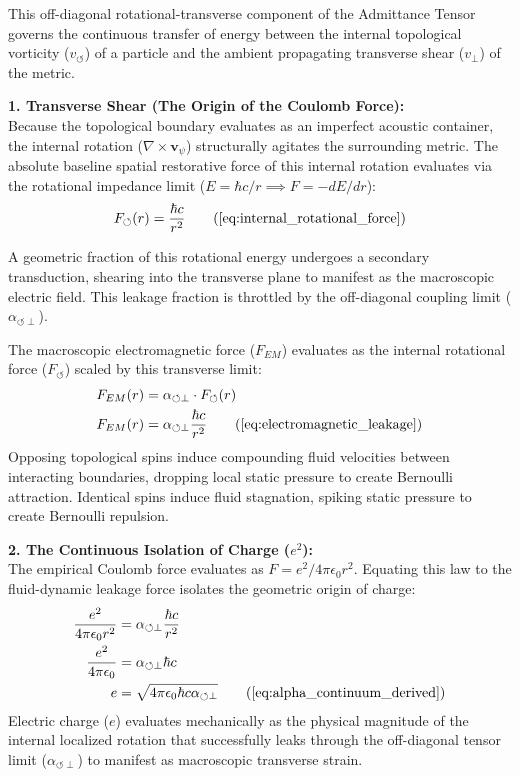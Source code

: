 \documentclass[11pt, a4paper]{article}
\begin{document}
This off-diagonal rotational-transverse component of the Admittance Tensor governs the continuous transfer of energy between the internal topological vorticity ($v_{\circlearrowleft}$) of a particle and the ambient propagating transverse shear ($v_{\perp}$) of the metric.

\textbf{1. Transverse Shear (The Origin of the Coulomb Force):} \\

Because the topological boundary evaluates as an imperfect acoustic container, the internal rotation ($\nabla \times \mathbf{v}_{\psi}$) structurally agitates the surrounding metric. The absolute baseline spatial restorative force of this internal rotation evaluates via the rotational impedance limit ($E = \hbar c / r \implies F = -dE/dr$):
\begin{equation}
    F_{\circlearrowleft}(r) = \frac{\hbar c}{r^2} \tag{\ref{eq:internal_rotational_force}}
\end{equation}

A geometric fraction of this rotational energy undergoes a secondary transduction, shearing into the transverse plane to manifest as the macroscopic electric field. This leakage fraction is throttled by the off-diagonal coupling limit ($\alpha_{\circlearrowleft \perp}$). 

The macroscopic electromagnetic force ($F_{EM}$) evaluates as the internal rotational force ($F_{\circlearrowleft}$) scaled by this transverse limit:
\begin{align}
    F_{EM}(r) &= \alpha_{\circlearrowleft \perp} \cdot F_{\circlearrowleft}(r)  \\
    F_{EM}(r) &= \alpha_{\circlearrowleft \perp} \frac{\hbar c}{r^2} \tag{\ref{eq:electromagnetic_leakage}}
\end{align}
Opposing topological spins induce compounding fluid velocities between interacting boundaries, dropping local static pressure to create Bernoulli attraction. Identical spins induce fluid stagnation, spiking static pressure to create Bernoulli repulsion.

\textbf{2. The Continuous Isolation of Charge ($e^2$):} \\
The empirical Coulomb force evaluates as $F = e^2 / 4\pi \epsilon_0 r^2$. Equating this law to the fluid-dynamic leakage force isolates the geometric origin of charge:
\begin{align}
    \frac{e^2}{4\pi \epsilon_0 r^2} &= \alpha_{\circlearrowleft \perp} \frac{\hbar c}{r^2}  \\
    \frac{e^2}{4\pi \epsilon_0} &= \alpha_{\circlearrowleft \perp} \hbar c  \\
    e &= \sqrt{4\pi \epsilon_0 \hbar c \alpha_{\circlearrowleft \perp}} \tag{\ref{eq:alpha_continuum_derived}}
\end{align}
Electric charge ($e$) evaluates mechanically as the physical magnitude of the internal localized rotation that successfully leaks through the off-diagonal tensor limit ($\alpha_{\circlearrowleft \perp}$) to manifest as macroscopic transverse strain. 
\end{document}
